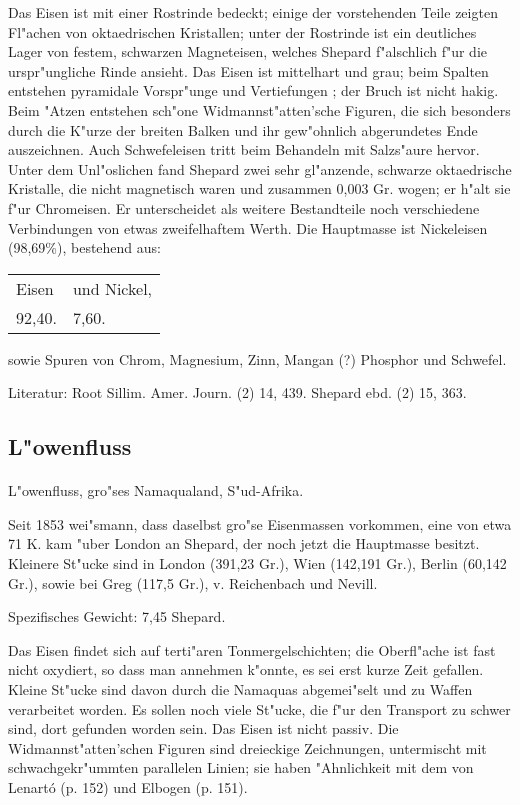 \documentclass[a4paper, 11pt, oneside]{article}
\begin{document}
Das Eisen ist mit einer Rostrinde bedeckt; einige der vorstehenden Teile zeigten Fl"achen von oktaedrischen Kristallen; unter der Rostrinde ist ein deutliches Lager von festem, schwarzen Magneteisen, welches Shepard f"alschlich f"ur die urspr"ungliche Rinde ansieht. Das Eisen ist mittelhart und grau; beim Spalten entstehen pyramidale Vorspr"unge und Vertiefungen ; der Bruch ist nicht hakig. Beim "Atzen entstehen sch"one Widmannst"atten'sche Figuren, die sich besonders durch die K"urze der breiten Balken und ihr gew"ohnlich abgerundetes Ende auszeichnen. Auch Schwefeleisen tritt beim Behandeln mit Salzs"aure hervor. Unter dem Unl"oslichen fand Shepard zwei sehr gl"anzende, schwarze oktaedrische Kristalle, die nicht magnetisch waren und zusammen 0,003 Gr. wogen; er h"alt sie f"ur Chromeisen. Er unterscheidet als weitere Bestandteile noch verschiedene Verbindungen von etwas zweifelhaftem Werth. Die Hauptmasse ist Nickeleisen (98,69\%), bestehend aus:
\begin{table}[H]
    \centering
    \begin{tabular}{l l}
        Eisen & und Nickel, \\
        92,40. & 7,60. \\
    \end{tabular}
\end{table}

sowie Spuren von Chrom, Magnesium, Zinn, Mangan (?) Phosphor und Schwefel.

\footnotesize
Literatur: Root Sillim. Amer. Journ. (2) 14, 439. Shepard ebd. (2) 15, 363.

\subsection{L"owenfluss}
\normalsize
\paragraph{}
L"owenfluss, gro"ses Namaqualand, S"ud-Afrika.

Seit 1853 wei"smann, dass daselbst gro"se Eisenmassen vorkommen, eine von etwa 71 K. kam "uber London an Shepard, der noch jetzt die Hauptmasse besitzt. Kleinere St"ucke sind in London (391,23 Gr.), Wien (142,191 Gr.), Berlin (60,142 Gr.), sowie bei Greg (117,5 Gr.), v. Reichenbach und Nevill.

Spezifisches Gewicht: 7,45 Shepard.

Das Eisen findet sich auf terti"aren Tonmergelschichten; die Oberfl"ache ist fast nicht oxydiert, so dass man annehmen k"onnte, es sei erst kurze Zeit gefallen. Kleine St"ucke sind davon durch die Namaquas abgemei"selt und zu Waffen verarbeitet worden. Es sollen noch viele St"ucke, die f"ur den Transport zu schwer sind, dort gefunden worden sein. Das Eisen ist nicht passiv. Die Widmannst"atten'schen Figuren sind dreieckige Zeichnungen, untermischt mit schwachgekr"ummten parallelen Linien; sie haben "Ahnlichkeit mit dem von Lenartó (p. 152) und Elbogen (p. 151).
\end{document}
